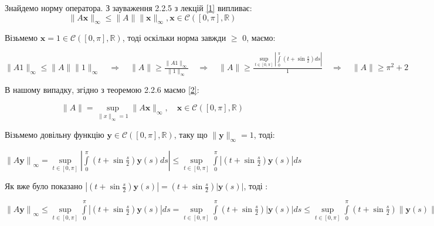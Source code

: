 \documentclass[a5paper, 20pt, titlepage]{article}
\newcommand{\x}{\textbf{x}}
\newcommand{\y}{\textbf{y}}
\begin{document}
\newpage{}

\vspace{4mm}
Знайдемо норму оператора. З зауваження 2.2.5 з лекцій \hyperlink{1}{[1]} випливає:
\vspace{-2mm}
$$ \| A \x \|_\infty \leqslant \| A \| \| \x \|_\infty, \x \in \mathcal{C} \left( [0, \pi], \mathbb{R} \right)$$

Візьмемо $\x = 1 \in \mathcal{C} \left( [0, \pi], \mathbb{R} \right)$, тоді оскільки норма завжди $\geqslant$ 0, маємо:

\vspace{3mm}
\hspace{4mm}
$\|A 1 \|_\infty \leqslant \| A \| \| 1 \|_\infty \quad \Rightarrow \quad \| A \| \geqslant \frac{\|A 1 \|_\infty}{\| 1 \|_\infty} \quad \Rightarrow \quad 
\| A \| \geqslant \frac{\sup \limits_{t \in [0,\pi]} \left| \int \limits_{0}^{\pi} \left(t + \sin \frac{s}{2} \right)ds \right|}{1} \quad \Rightarrow \quad
\| A \| \geqslant \pi^2 + 2$

\vspace{4mm}
В нашому випадку, згідно з теоремою 2.2.6 маємо \hyperlink{2}{[2]}:

$$ \| A \| = \sup \limits_{\| x \|_\infty = 1} \| A \x\|_\infty, \quad \x \in \mathcal{C} \left( [0, \pi], \mathbb{R} \right) $$

Візьмемо довільну функцію $\y \in \mathcal{C} \left( [0, \pi], \mathbb{R} \right)$, таку що $\| \y \|_\infty = 1$,  тоді:

\vspace{3mm}
\hspace{4mm}
$\left\| A \y \right\|_\infty = \sup \limits_{t \in [0, \pi]} \left| \int \limits_{0}^{\pi} \left( t + \sin \frac{s}{2} \right) \y(s)  ds \right|
\leqslant \sup \limits_{t \in [0, \pi]}  \int \limits_{0}^{\pi} \left| \left( t + \sin \frac{s}{2} \right) \y(s) \right| ds$

\vspace{5mm}
Як вже було показано $\left| \left( t + \sin \frac{s}{2} \right) \y(s) \right| = \left( t + \sin \frac{s}{2} \right)  \left| \y(s) \right|$, тоді :

\vspace{5mm}
\hspace{4mm}
$\left\| A \y \right\|_\infty \leqslant \sup \limits_{t \in [0, \pi]}  \int \limits_{0}^{\pi} \left| \left( t + \sin \frac{s}{2} \right) \y(s) \right| ds =
\sup \limits_{t \in [0, \pi]}  \int \limits_{0}^{\pi} \left( t + \sin \frac{s}{2} \right)  \left| \y(s) \right| ds \leqslant
\sup \limits_{t \in [0, \pi]}  \int \limits_{0}^{\pi} \left( t + \sin \frac{s}{2} \right)  \left\| \y(s) \right\|_\infty ds = $
\end{document}
